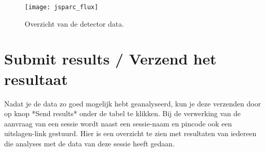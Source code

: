 \begin{figure}[ht]
    \centering
    \texttt{[image: jsparc\_flux]}
    \caption{Overzicht  van de detector data. }
    \label{fig:detectordata}
\end{figure}

\section{Submit results / Verzend het resultaat}

Nadat je de data zo goed mogelijk hebt geanalyseerd, kun je deze verzenden 
door op knop *Send results* onder de tabel te klikken. Bij de verwerking van 
de aanvraag van een sessie wordt naast een sessie-naam en pincode ook een 
uitslagen-link gestuurd. Hier is een overzicht te zien met resultaten van 
iedereen die analyses met de data van deze sessie heeft gedaan. 
   
